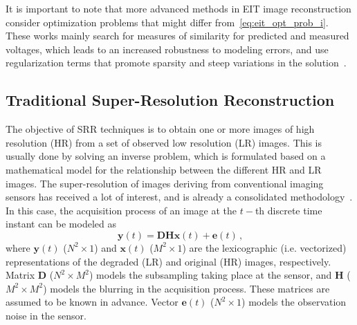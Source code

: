 \documentclass[10pt]{IEEEtran}
\newcommand{\ve}{\mathbf{e}}
\newcommand{\vx}{\mathbf{x}}
\newcommand{\vy}{\mathbf{y}}
\newcommand{\mD}{\mathbf{D}}
\newcommand{\mH}{\mathbf{H}}
\begin{document}
It is important to note that more advanced methods in EIT image reconstruction consider optimization problems that might differ from~\eqref{eq:eit_opt_prob_i}.
%
These works mainly search for measures of similarity for predicted and measured voltages, which leads to an increased robustness to modeling errors, and use regularization terms that promote sparsity and steep variations in the solution~\cite{borsic2012primaldualL1L1,borsic2010invivoTV}.
















\subsection{Traditional Super-Resolution Reconstruction}
\label{sec:prelim_srr}

The objective of SRR techniques is to obtain one or more images of high resolution (HR) from a set of observed low resolution (LR) images.
%
This is usually done by solving an inverse problem, which is formulated
based on a mathematical model for the relationship between the different HR and LR images.
%
The super-resolution of images deriving from conventional imaging sensors has received a lot of interest, and is already a consolidated methodology~\cite{Nasrollahi14}.
%
In this case, the acquisition process of an image at the $t-$th discrete time instant can be modeled as~\cite{Nasrollahi14}
\begin{equation} \label{eq:aquis}
    \vy(t) = \mD\mH\vx(t) + \ve(t) \,
    \text{,}
\end{equation}
where $\vy(t)$ ($N^2 \times 1$) and $\vx(t)$ ($M^2 \times 1$) are the lexicographic (i.e. vectorized) representations of the degraded (LR) and original (HR) images, respectively.
%
Matrix $\mD$ ($N^2 \times M^2$) models the subsampling taking place at the sensor, and $\mH$ ($M^2 \times M^2$) models the blurring in the acquisition process. These matrices are assumed to be known in advance.
%
Vector $\ve(t)$ ($N^2 \times 1$) models the observation noise in the sensor.
\end{document}
